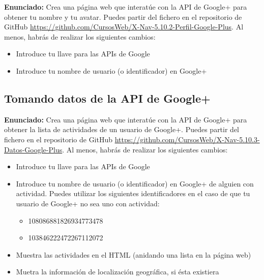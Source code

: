 \textbf{Enunciado:} Crea una página web que interatúe con la API de Google+ para obtener tu nombre y tu avatar. Puedes partir del fichero en el repositorio de GitHub \url{https://github.com/CursosWeb/X-Nav-5.10.2-Perfil-Google-Plus}. Al menos, habrás de realizar los siguientes cambios:

\begin{itemize}
  \item Introduce tu llave para las APIs de Google
  \item Introduce tu nombre de usuario (o identificador) en Google+
\end{itemize}


\subsection{Tomando datos de la API de Google+}
\label{subsec:tomando-datos-googleplus}

\textbf{Enunciado:} Crea una página web que interatúe con la API de Google+ para obtener la lista de actividades de un usuario de Google+. Puedes partir del fichero en el repositorio de GitHub \url{https://github.com/CursosWeb/X-Nav-5.10.3-Datos-Google-Plus}. Al menos, habrás de realizar los siguientes cambios:

\begin{itemize}
  \item Introduce tu llave para las APIs de Google
  \item Introduce tu nombre de usuario (o identificador) en Google+ de alguien con actividad. Puedes utilizar los siguientes identificadores en el caso de que tu usuario de Google+ no sea uno con actividad:
  \begin{itemize}
    \item 108086881826934773478
    \item 103846222472267112072
  \end{itemize}
  \item Muestra las actividades en el HTML (anidando una lista en la página web)
  \item Muetra la información de localización geográfica, si ésta existiera
\end{itemize}


